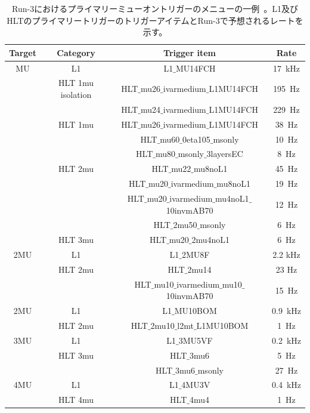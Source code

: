 \begin{table}[]
    \caption{Run-3におけるプライマリーミューオントリガーのメニューの一例~\cite{article:Run3trigmenu}。L1及びHLTのプライマリートリガーのトリガーアイテムとRun-3で予想されるレートを示す。}
    \label{triigermenu}
    \centering
    \begin{tabular}{|c|c|c|c|}
    \hline
        Target & Category & Trigger item & Rate\\
        \hline
        MU  & L1 & L1$\_$MU14FCH & 17~kHz\\
        \hline
            &HLT 1mu isolation & HLT$\_$mu26$\_$ivarmedium$\_$L1MU14FCH & 195~Hz\\
            &        & HLT$\_$mu24$\_$ivarmedium$\_$L1MU14FCH & 229~Hz\\
        \hline
            &HLT 1mu& HLT$\_$mu26$\_$ivarmedium$\_$L1MU14FCH & 38~Hz\\
            &       & HLT$\_$mu60$\_$0eta105$\_$msonly & 10~Hz\\
            &       & HLT$\_$mu80$\_$msonly$\_$3layersEC & 8~Hz\\
        \hline
            &HLT 2mu & HLT$\_$mu22$\_$mu8noL1 & 45~Hz\\
            &       & HLT$\_$mu20$\_$ivarmedium$\_$mu8noL1 & 19~Hz\\
            &       & HLT$\_$mu20$\_$ivarmedium$\_$mu4noL1$\_$10invmAB70 & 12~Hz\\
            &       & HLT$\_$2mu50$\_$msonly & 6~Hz\\
        \hline
            &HLT 3mu    & HLT$\_$mu20$\_$2mu4noL1 & 6~Hz\\
        \hline
        \hline
        2MU & L1        & L1$\_$2MU8F & 2.2 kHz\\
        \hline
            & HLT 2mu   & HLT$\_$2mu14 & 23 Hz\\
            &           & HLT$\_$mu10$\_$ivarmedium$\_$mu10$\_$10invmAB70 & 15~Hz\\
        \hline
        \hline
        2MU & L1 & L1$\_$MU10BOM & 0.9~kHz\\
        \hline
            & HLT 2mu & HLT$\_$2mu10$\_$l2mt$\_$L1MU10BOM & 1~Hz\\
        \hline
        \hline
        3MU &L1 & L1$\_$3MU5VF & 0.2~kHz\\
        \hline
            &HLT 3mu & HLT$\_$3mu6 & 5~Hz\\
            &        &HLT$\_$3mu6$\_$msonly &27~Hz\\
        \hline
        \hline
        4MU & L1 & L1$\_$4MU3V & 0.4~kHz\\
        \hline
            & HLT 4mu & HLT$\_$4mu4 & 1~Hz\\
        \hline
    \end{tabular}
\end{table}



